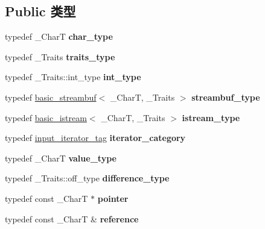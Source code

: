 \subsection*{Public 类型}
\begin{DoxyCompactItemize}
\item 
\mbox{\label{classistreambuf__iterator_a84fd4d12150240676a1876df08f198bc}} 
typedef \+\_\+\+CharT {\bfseries char\+\_\+type}
\item 
\mbox{\label{classistreambuf__iterator_a0b9d46c21ce15588fe76940e912160ee}} 
typedef \+\_\+\+Traits {\bfseries traits\+\_\+type}
\item 
\mbox{\label{classistreambuf__iterator_a4b3a0335b5986ea7cbde5a968712914f}} 
typedef \+\_\+\+Traits\+::int\+\_\+type {\bfseries int\+\_\+type}
\item 
\mbox{\label{classistreambuf__iterator_a0c59816fb8aba7945ecc34750d429db1}} 
typedef \hyperlink{classbasic__streambuf}{basic\+\_\+streambuf}$<$ \+\_\+\+CharT, \+\_\+\+Traits $>$ {\bfseries streambuf\+\_\+type}
\item 
\mbox{\label{classistreambuf__iterator_a5473b89839705775b7c9e6323e97ce2a}} 
typedef \hyperlink{classbasic__istream}{basic\+\_\+istream}$<$ \+\_\+\+CharT, \+\_\+\+Traits $>$ {\bfseries istream\+\_\+type}
\item 
\mbox{\label{classistreambuf__iterator_a017380ba2d2f15df3440f099aca7d45c}} 
typedef \hyperlink{structinput__iterator__tag}{input\+\_\+iterator\+\_\+tag} {\bfseries iterator\+\_\+category}
\item 
\mbox{\label{classistreambuf__iterator_a1ab84af2bfac50ea378228301f5239a3}} 
typedef \+\_\+\+CharT {\bfseries value\+\_\+type}
\item 
\mbox{\label{classistreambuf__iterator_a05772c550c536f76ff75416391486db7}} 
typedef \+\_\+\+Traits\+::off\+\_\+type {\bfseries difference\+\_\+type}
\item 
\mbox{\label{classistreambuf__iterator_a9306a4f8acf7066311eb409272c3425a}} 
typedef const \+\_\+\+CharT $\ast$ {\bfseries pointer}
\item 
\mbox{\label{classistreambuf__iterator_aa8ce72c628178f45aee6d240c02e8724}} 
typedef const \+\_\+\+CharT \& {\bfseries reference}
\end{DoxyCompactItemize}
